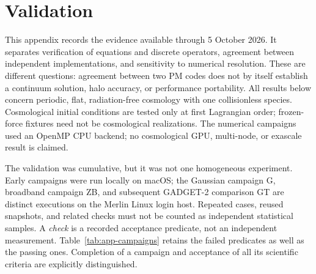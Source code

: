 \section{Validation}
\label{app:validation}

This appendix records the evidence available through 5 October 2026.  It separates
verification of equations and discrete operators, agreement between independent
implementations, and sensitivity to numerical resolution.  These are different
questions: agreement between two PM codes does not by itself establish a
continuum solution, halo accuracy, or performance portability.  All results
below concern periodic, flat, radiation-free cosmology with one collisionless
species.  Cosmological initial conditions are tested only at first Lagrangian
order; frozen-force fixtures need not be cosmological realizations.  The numerical campaigns
used an OpenMP CPU backend; no cosmological GPU, multi-node, or exascale result
is claimed.

The validation was cumulative, but it was not one homogeneous experiment.
Early campaigns were run locally on macOS; the Gaussian campaign G, broadband
campaign ZB, and subsequent GADGET-2 comparison GT are distinct executions on
the Merlin Linux login host.  Repeated cases,
reused snapshots, and related checks must not be counted as independent
statistical samples.  A \emph{check} is a recorded acceptance predicate, not an
independent measurement.  Table~\ref{tab:app-campaigns} retains the failed
predicates as well as the passing ones.  Completion of a campaign and acceptance
of all its scientific criteria are explicitly distinguished.

